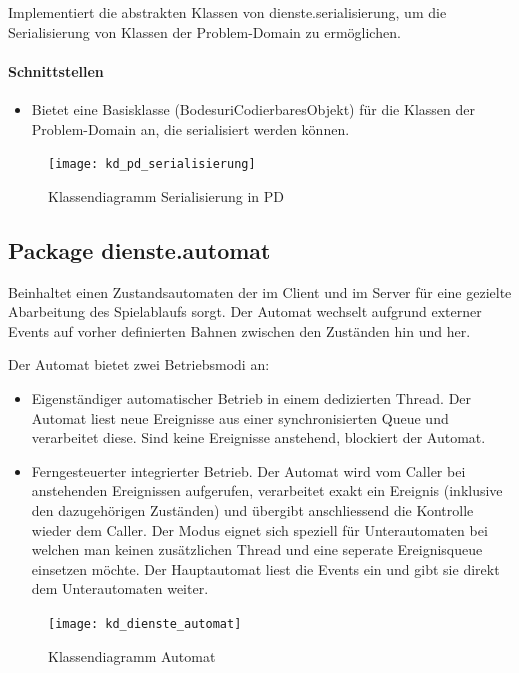 \documentclass[12pt,halfparskip]{scrartcl}
\begin{document}
Implementiert die abstrakten Klassen von dienste.serialisierung, um die Serialisierung von Klassen der Problem-Domain zu ermöglichen.

\paragraph{Schnittstellen}
\begin{itemize}
	\item Bietet eine Basisklasse (BodesuriCodierbaresObjekt) für die Klassen der Problem-Domain an, die serialisiert werden können.
\end{itemize}

\begin{figure}[H]
	\centering
	\texttt{[image: kd\_pd\_serialisierung]}
	\caption{Klassendiagramm Serialisierung in PD}
	\label{fig:kd_pd_serialisierung}
\end{figure}


\clearpage
\subsection{Package dienste.automat}

Beinhaltet einen Zustandsautomaten der im Client und im Server für eine gezielte Abarbeitung des Spielablaufs sorgt. Der Automat wechselt aufgrund externer Events auf vorher definierten Bahnen zwischen den Zuständen hin und her.

Der Automat bietet zwei Betriebsmodi an:
\begin{itemize}
	\item Eigenständiger automatischer Betrieb in einem dedizierten Thread. Der Automat liest neue Ereignisse aus einer synchronisierten Queue und verarbeitet diese. Sind keine Ereignisse anstehend, blockiert der Automat.
	\item Ferngesteuerter integrierter Betrieb. Der Automat wird vom Caller bei anstehenden Ereignissen aufgerufen, verarbeitet exakt ein Ereignis (inklusive den dazugehörigen Zuständen) und übergibt anschliessend die Kontrolle wieder dem Caller. Der Modus eignet sich speziell für Unterautomaten bei welchen man keinen zusätzlichen Thread und eine seperate Ereignisqueue einsetzen möchte. Der Hauptautomat liest die Events ein und gibt sie direkt dem Unterautomaten weiter. 
\end{itemize}

\begin{figure}[H]
	\centering
	\texttt{[image: kd\_dienste\_automat]}
	\caption{Klassendiagramm Automat}
	\label{fig:kd_dienste_automat}
\end{figure}
\end{document}
